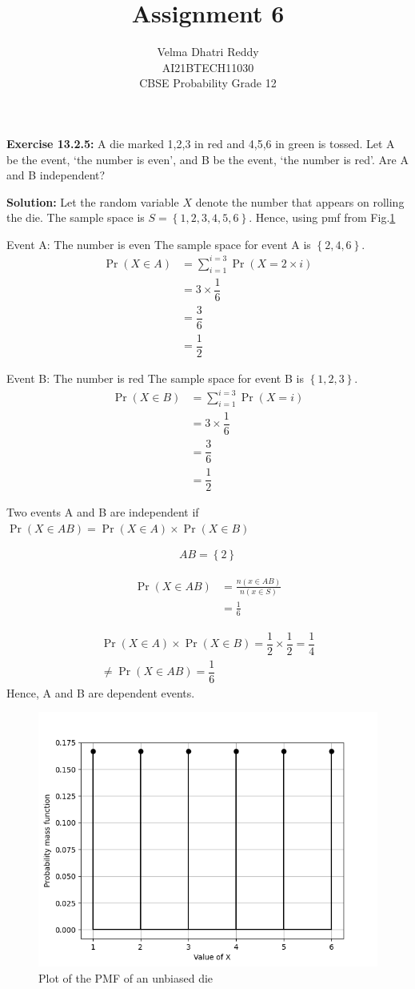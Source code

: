 \documentclass[journal,11pt,twocolumn]{IEEEtran}
\title{Assignment 6}
\author{Velma Dhatri Reddy \\ \normalsize AI21BTECH11030 \\ \vspace*{10pt} \Large CBSE Probability Grade 12}
\providecommand{\pr}[1]{\ensuremath{\Pr\left(#1\right)}}
\providecommand{\cbrak}[1]{\ensuremath{\left\{#1\right\}}}
\providecommand{\brak}[1]{\ensuremath{\left(#1\right)}}
\begin{document}
\maketitle
\textbf{Exercise 13.2.5:}
A die marked 1,2,3 in red and 4,5,6 in green is tossed. Let A be the event, ‘the number is even’, and B be the event, ‘the number is red’. Are A and B independent?

\textbf{Solution:} Let the random variable $X$ denote the number that appears on rolling the die. The sample space is $S = \cbrak{1, 2, 3, 4, 5, 6}$.
Hence, using pmf from Fig.\ref{fig:pmf}

Event A: The number is even
The sample space for event A is \cbrak{2,4,6}.
\begin{align}
    \pr{X \in A}&= \sum_{i = 1}^{i = 3}\pr{X = 2\times i}\\
    &= 3\times \dfrac{1}{6}\\
    &= \dfrac{3}{6}\\
    &= \dfrac{1}{2}
\end{align}

Event B: The number is red
The sample space for event B is \cbrak{1,2,3}.
\begin{align}
    \pr{X \in B}&= \sum_{i = 1}^{i = 3}\pr{X = i}\\
    &= 3\times \dfrac{1}{6}\\
    &= \dfrac{3}{6}\\
    &= \dfrac{1}{2}
\end{align}

Two events A and B are independent if 
$\pr{X \in AB } = \pr{X \in A}\times\pr{X \in B}$

\begin{align}
    AB = \cbrak{2}
\end{align}
    
\begin{align}
    \pr{X \in AB} &= \frac{n\brak{x \in AB}}{n\brak{x \in S}}\\
    &= \frac{1}{6}
\end{align}

\begin{multline}
    \pr{X \in A}\times\pr{X \in B} = \dfrac{1}{2}\times\dfrac{1}{2} = \dfrac{1}{4}\\
    \neq \pr{X \in AB } = \dfrac{1}{6}
\end{multline}
Hence, A and B are dependent events.

\begin{figure}[!ht]
\centering
\includegraphics[width=\columnwidth]{figs/pmf.png}
\caption{Plot of the PMF of an unbiased die}
\label{fig:pmf}
\end{figure}
\end{document}

